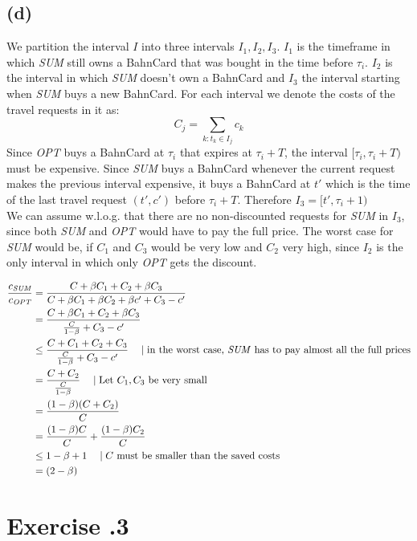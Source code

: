 \documentclass[a4paper,12pt]{scrartcl}
\newcounter{sheet}
\newcommand{\printsheet}{\arabic{sheet}}
\begin{document}
\subsection*{(d)}
We partition the interval $I$ into three intervals $I_1,I_2,I_3$. $I_1$ is the timeframe in which \textit{SUM} still owns a BahnCard that was bought in the time before $\tau_i$. $I_2$ is the interval in which \textit{SUM} doesn't own a BahnCard and $I_3$ the interval starting when \textit{SUM} buys a new BahnCard.
For each interval we denote the costs of the travel requests in it as:
\[C_j = \sum_{k: t_k \in I_j} c_k\] 
Since \textit{OPT} buys a BahnCard at $\tau_i$ that expires at $\tau_i + T$, the interval $[\tau_i,\tau_i+T)$ must be expensive. Since \textit{SUM} buys a BahnCard whenever the current request makes the previous interval expensive, it buys a BahnCard at $t'$ which is the time of the last travel request $(t',c')$ before $\tau_i+T$. Therefore $I_3 = [t',\tau_i+1)$\\
We can assume w.l.o.g. that there are no non-discounted requests for \textit{SUM} in $I_3$, since both \textit{SUM} and \textit{OPT} would have to pay the full price. 
The worst case for \textit{SUM} would be, if $C_1$ and $C_3$ would be very low and $C_2$ very high, since $I_2$ is the only interval in which only \textit{OPT} gets the discount.

\begin{align*}
\frac{c_{\textit{SUM}}}{c_{\textit{OPT}}} &= \frac{C + \beta C_1 + C_2 + \beta C_3}{C + \beta C_1 + \beta C_2 + \beta c' + C_3 - c'} \\
&= \frac{C + \beta C_1 + C_2 + \beta C_3}{\frac{C}{1-\beta} + C_3 - c'} \\
&\leq  \frac{C + C_1 + C_2 + C_3}{\frac{C}{1-\beta} + C_3 - c'} \quad \mid \text{in the worst case, \textit{SUM} has to pay almost all the full prices}\\
&= \frac{C+C_2}{\frac{C}{1-\beta}} \quad \mid \text{Let }C_1, C_3 \text{ be very small}\\
&= \frac{(1-\beta)(C+C_2)}{C} \\
&= \frac{(1-\beta)C}{C} + \frac{(1-\beta)C_2}{C} \\
&\leq  1-\beta + 1 \quad \mid C \text{ must be smaller than the saved costs} \\
&= (2-\beta)
\end{align*}


\section*{Exercise \printsheet.3}
\end{document}
